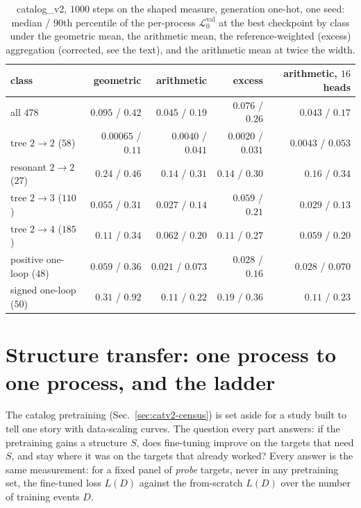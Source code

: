 \documentclass[11pt]{article}
\newcommand{\vlnr}{\mathcal{L}^{\mathrm{val}}_{0}}   %
\begin{document}
\begin{table}[H]
\centering
\caption{catalog\_v2, $1000$ steps on the shaped measure, generation one-hot, one seed: median
/ $90$th percentile of the per-process $\vlnr$ at the best checkpoint by class under the geometric mean, the
arithmetic mean, the reference-weighted (excess) aggregation (corrected, see the text), and the
arithmetic mean at twice the width.}
\label{tab:catv2_excess}
\small
\begin{tabular}{@{}lrrrr@{}}
\toprule
class & geometric & arithmetic & excess & arithmetic, $16$ heads \\
\midrule
all $478$ & $0.095$ / $0.42$ & $0.045$ / $0.19$ & $0.076$ / $0.26$ & $0.043$ / $0.17$ \\
tree $2\to2$ ($58$) & $0.00065$ / $0.11$ & $0.0040$ / $0.041$ & $0.0020$ / $0.031$ & $0.0043$ / $0.053$ \\
resonant $2\to2$ ($27$) & $0.24$ / $0.46$ & $0.14$ / $0.31$ & $0.14$ / $0.30$ & $0.16$ / $0.34$ \\
tree $2\to3$ ($110$) & $0.055$ / $0.31$ & $0.027$ / $0.14$ & $0.059$ / $0.21$ & $0.029$ / $0.13$ \\
tree $2\to4$ ($185$) & $0.11$ / $0.34$ & $0.062$ / $0.20$ & $0.11$ / $0.27$ & $0.059$ / $0.20$ \\
positive one-loop ($48$) & $0.059$ / $0.36$ & $0.021$ / $0.073$ & $0.028$ / $0.16$ & $0.028$ / $0.070$ \\
signed one-loop ($50$) & $0.31$ / $0.92$ & $0.11$ / $0.22$ & $0.19$ / $0.36$ & $0.11$ / $0.23$ \\
\bottomrule
\end{tabular}
\end{table}

\section{Structure transfer: one process to one process, and the ladder}\label{sec:ladder}

The catalog pretraining (Sec.~\ref{sec:catv2-census}) is set aside for a study built to tell
one story with data-scaling curves. The question every part answers: if the pretraining gains a
structure $S$, does fine-tuning improve on the targets that need $S$, and stay where it was on
the targets that already worked? Every answer is the same measurement: for a fixed panel of
\emph{probe} targets, never in any pretraining set, the fine-tuned loss $L(D)$ against the
from-scratch $L(D)$ over the number of training events $D$.
\end{document}
